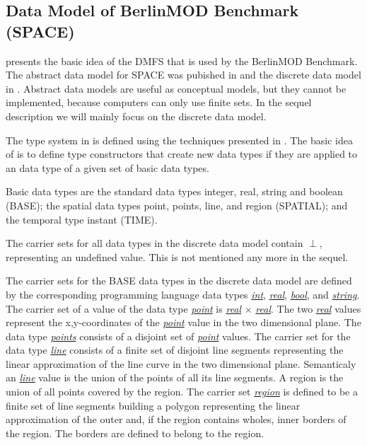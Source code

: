 \documentclass[a4paper]{article}
\newcommand{\bmodb} {BerlinMOD Benchmark}
\newcommand{\dt}[1]{\textsl{\underline{#1}}}
\begin{document}
\subsection{Data Model of \bmodb{} (SPACE)}
\label{sec:bmodbdatamod}
\cite{STDTModelingQueryingMOinDErwig} presents the basic idea of the DMFS that
is used by the \bmodb{}. The abstract data model for SPACE was pubished in
\cite{RepresentingMovingObjectsGueting} and the discrete data model in
\cite{DataModelDataStructureGueting}. Abstract data models are useful as conceptual
models, but they cannot be implemented, because computers can only use finite sets.
In the sequel description we will mainly focus on the discrete data model.

The type system in \cite{RepresentingMovingObjectsGueting} is defined using the
techniques presented in \cite{SecondOrderSignatureGueting}. The basic idea of
\cite{RepresentingMovingObjectsGueting} is to define type constructors
that create new data types if they are applied to an data type of a given set of
basic data types.

Basic data types are the standard data types integer, real, string and boolean (BASE);
the spatial data types point, points, line, and region (SPATIAL);
and the temporal type instant (TIME).

The carrier sets for all data types in the discrete data model contain $\perp$,
representing an undefined value. This is not mentioned any more in the sequel.

The carrier sets for the BASE data types in the discrete data model are defined
by the corresponding programming language data types \dt{int}, \dt{real}, \dt{bool},
and \dt{string}. The carrier set of a value of the data type \dt{point} is
\dt{real} $\times$ \dt{real}. The two \dt{real} values represent the x,y-coordinates
of the \dt{point} value in the two dimensional plane. The data type \dt{points}
consists of a disjoint set of \dt{point} values. The carrier set for the data type \dt{line}
consists of a finite set of disjoint line segments representing the linear
approximation of the line curve in the two dimensional plane. Semanticaly an
\dt{line} value is the union of the points of all its line segments. A region
is the union of all points covered by the region. The carrier set \dt{region}
is defined to be a finite set of line segments building a polygon representing
the linear approximation of the outer and, if the region contains wholes, inner
borders of the region. The borders are defined to belong to the region.
\end{document}
